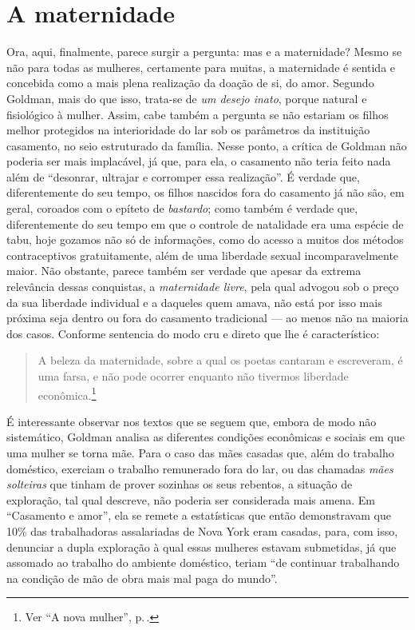 \section{A maternidade}

Ora, aqui, finalmente, parece surgir a pergunta: mas e a maternidade?
Mesmo se não para todas as mulheres, certamente para muitas, a
maternidade é sentida e concebida como a mais plena realização da doação
de si, do amor. Segundo Goldman, mais do que isso, trata-se de \textit{um
desejo inato}, porque natural e fisiológico à mulher. Assim, cabe
também a pergunta se não estariam os filhos melhor protegidos na
interioridade do lar sob os parâmetros da instituição casamento, no seio
estruturado da família. Nesse ponto, a crítica de Goldman não poderia
ser mais implacável, já que, para ela, o casamento não teria feito nada
além de ``desonrar, ultrajar e corromper essa realização''. É verdade
que, diferentemente do seu tempo, os filhos nascidos fora do casamento
já não são, em geral, coroados com o epíteto de \textit{bastardo}; como
também é verdade que, diferentemente do seu tempo em que o controle de
natalidade era uma espécie de tabu, hoje gozamos não só de informações,
como do acesso a muitos dos métodos contraceptivos gratuitamente, além
de uma liberdade sexual incomparavelmente maior. Não obstante, parece
também ser verdade que apesar da extrema relevância dessas conquistas, a
\textit{maternidade livre}, pela qual advogou sob o preço da sua liberdade
individual e a daqueles quem amava, não está por isso mais próxima seja
dentro ou fora do casamento tradicional --- ao menos não na maioria dos
casos. Conforme sentencia do modo cru e direto que lhe é característico:

\begin{quote}
A beleza da maternidade, sobre a qual os poetas cantaram
e escreveram, é uma farsa, e não pode ocorrer enquanto não tivermos
liberdade econômica.\footnote{Ver ``A nova mulher'', p.\,\pageref{maternidade}.}
\end{quote}

É interessante observar nos textos que se seguem que, embora de modo não
sistemático, Goldman analisa as diferentes condições econômicas e
sociais em que uma mulher se torna mãe. Para o caso das mães casadas
que, além do trabalho doméstico, exerciam o trabalho remunerado fora do
lar, ou das chamadas \textit{mães solteiras} que tinham de prover sozinhas os
seus rebentos, a situação de exploração, tal qual descreve, não poderia
ser considerada mais amena. Em ``Casamento e amor'', ela se remete a
estatísticas que então demonstravam que 10\% das trabalhadoras
assalariadas de Nova York eram casadas, para, com isso, denunciar a
dupla exploração à qual essas mulheres estavam submetidas, já que
assomado ao trabalho do ambiente doméstico, teriam ``de continuar
trabalhando na condição de mão de obra mais mal paga do mundo''.

